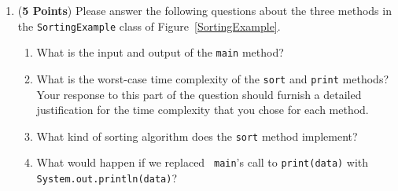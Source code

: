 \documentclass[12pt]{article}
\begin{document}
\begin{enumerate}
\begin{enumerate}


\item ({\bf 5 Points}) Please answer the following questions about the
  three methods in the {\tt SortingExample} class of
  Figure~\ref{SortingExample}.

  \begin{enumerate}

  \item What is the input and output of the {\tt main} method?

  \item What is the worst-case time complexity of the {\tt sort} and
    {\tt print} methods?  Your response to this part of the question
    should furnish a detailed justification for the time complexity
    that you chose for each method.

  \item What kind of sorting algorithm does the {\tt sort} method
    implement?

  \item \begin{sloppypar} What would happen if we replaced {\tt
      main}'s call to {\tt print(data)} with {\tt
      System.out.println(data)}? \end{sloppypar}

  \end{enumerate}
  


\end{enumerate}
\end{enumerate}
\end{document}
